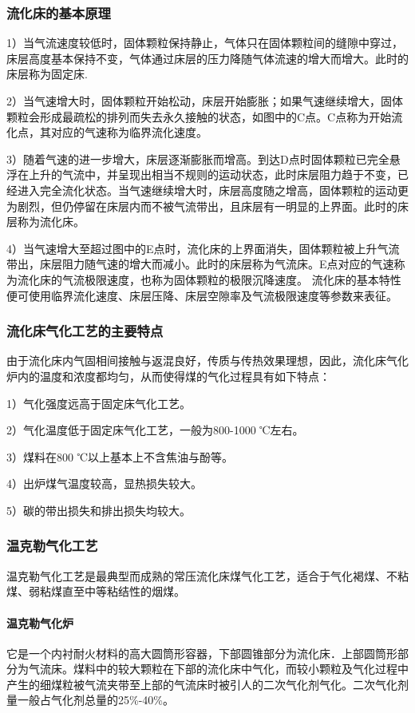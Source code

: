 \documentclass[10pt,openany]{ctexbook}
\begin{document}
 \subsubsection{流化床的基本原理}
1）当气流速度较低时，固体颗粒保持静止，气体只在固体颗粒间的缝隙中穿过，床层高度基本保持不变，气体通过床层的压力降随气体流速的增大而增大。此时的床层称为固定床.\par
2）当气速增大时，固体颗粒开始松动，床层开始膨胀；如果气速继续增大，固体颗粒会形成最疏松的排列而失去永久接触的状态，如图中的C点。C点称为开始流化点，其对应的气速称为临界流化速度。\par
 3）随着气速的进一步增大，床层逐渐膨胀而增高。到达D点时固体颗粒已完全悬浮在上升的气流中，并呈现出相当不规则的运动状态，此时床层阻力趋于不变，已经进入完全流化状态。当气速继续增大时，床层高度随之增高，固体颗粒的运动更为剧烈，但仍停留在床层内而不被气流带出，且床层有一明显的上界面。此时的床层称为流化床。\par
4）当气速增大至超过图中的E点时，流化床的上界面消失，固体颗粒被上升气流带出，床层阻力随气速的增大而减小。此时的床层称为气流床。E点对应的气速称为流化床的气流极限速度，也称为固体颗粒的极限沉降速度。
    流化床的基本特性便可使用临界流化速度、床层压降、床层空隙率及气流极限速度等参数来表征。
 \subsubsection{流化床气化工艺的主要特点}
由于流化床内气固相间接触与返混良好，传质与传热效果理想，因此，流化床气化炉内的温度和浓度都均匀，从而使得煤的气化过程具有如下特点：\par
1）气化强度远高于固定床气化工艺。\par
2）气化温度低于固定床气化工艺，一般为800-1000 ℃左右。\par
3）煤料在800 ℃以上基本上不含焦油与酚等。\par
4）出炉煤气温度较高，显热损失较大。\par
5）碳的带出损失和排出损失均较大。
 \subsubsection{温克勒气化工艺}
温克勒气化工艺是最典型而成熟的常压流化床煤气化工艺，适合于气化褐煤、不粘煤、弱粘煤直至中等粘结性的烟煤。
\paragraph{温克勒气化炉}
它是一个内衬耐火材料的高大圆筒形容器，下部圆锥部分为流化床．上部圆筒形部分为气流床。煤料中的较大颗粒在下部的流化床中气化，而较小颗粒及气化过程中产生的细煤粒被气流夹带至上部的气流床时被引人的二次气化剂气化。二次气化剂量一般占气化剂总量的25\%-40\%。
\end{document}

